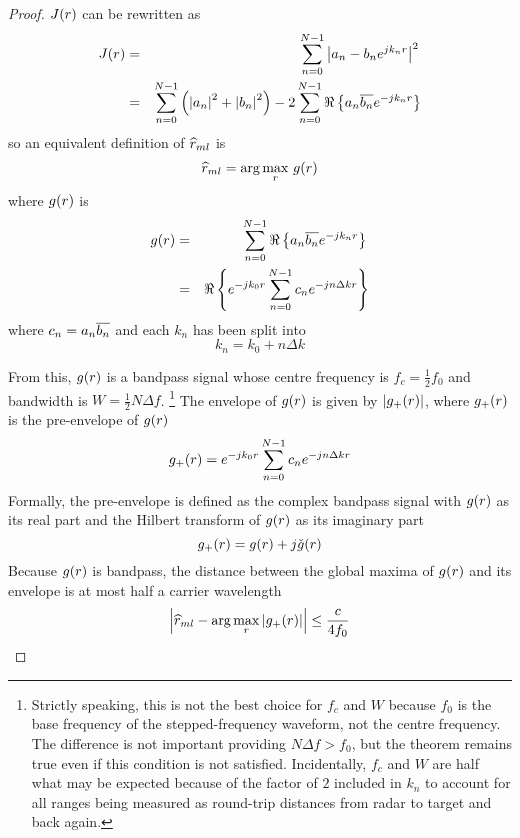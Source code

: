\begin{proof}
$J({r})$ can be rewritten as
\begin{eqnarray}
J({r})&=&\sum_{n=0}^{N-1} \left|a_n-b_n{e^{jk_n{r}}}\right|^2{\nonumber}\\
&=&\sum_{n=0}^{N-1}\left(\left|a_n\right|^2+\left|b_n\right|^2\right)
-2\sum_{n=0}^{N-1}\Re\left\{a_n\overline{b_n}{e^{-jk_n{r}}}\right\}
\end{eqnarray}
so an equivalent definition of $\widehat{r}_{ml}$ is
\begin{equation}
\widehat{r}_{ml}=\arg\max_{{r}}\,g({r})
\end{equation}
where $g({r})$ is 
\begin{eqnarray}
g({r})&=&\sum_{n=0}^{N-1}\Re\left\{a_n\overline{b_n}{e^{-jk_n{r}}}\right\}{\nonumber}\\
&=&\Re\left\{{e^{-jk_0{r}}}\sum_{n=0}^{N-1}c_n{e^{-jn\Delta k{r}}}\right\}
\end{eqnarray}
where $c_n=a_n\overline{b_n}$ and each $k_n$ has been split into 
\begin{equation}
k_n=k_0+n\Delta k
\end{equation}

From this, $g({r})$ is a bandpass signal whose centre frequency is
$f_c=\frac{1}{2}f_0$ and bandwidth is $W=\frac{1}{2}N\Delta f$.%
\footnote{Strictly speaking, this is not the best choice for $f_c$ and $W$ 
because $f_0$ is the base frequency of the stepped-frequency waveform, not
the centre frequency.  The difference is not important providing 
$N\Delta f>f_0$, but the theorem remains true even if this condition is not 
satisfied.  Incidentally, $f_c$ and $W$ are half what may be expected
because of the factor of $2$ included in $k_n$ to account for all ranges
being measured as round-trip distances from radar to target and back again.} 
The envelope of $g({r})$ is given by $\left|g_{+}({r})\right|$, where
$g_{+}({r})$ is the pre-envelope of $g({r})$
\begin{equation}
g_{+}({r})={e^{-jk_0{r}}}\sum_{n=0}^{N-1}c_n{e^{-jn\Delta k{r}}}
\end{equation}
Formally, the pre-envelope is defined as the complex bandpass signal with
$g({r})$ as its real part and the Hilbert transform of $g({r})$ as its
imaginary part
\begin{equation}
g_{+}({r})=g({r})+j\check{g}({r})
\end{equation}
Because $g({r})$ is bandpass, the distance between the global maxima of 
$g({r})$ and its envelope is at most half a carrier wavelength
\begin{equation}
\left|\widehat{r}_{ml}-\arg\max_{{r}}\left|g_{+}({r})\right|\right|\leq\frac{c}{4f_0}
\end{equation}


\end{proof}
